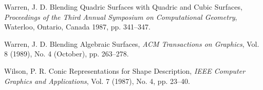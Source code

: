 \begin{thebibliography}{999}
     Warren, J. D.
     Blending Quadric Surfaces with Quadric and Cubic Surfaces,
     {\em Proceedings of the Third Annual Symposium on Computational Geometry},
     Waterloo, Ontario, Canada 1987, pp. 341--347.

     Warren, J. D.
     Blending Algebraic Surfaces,
     {\em ACM Transactions on Graphics},
     Vol. 8 (1989), No. 4 (October), pp. 263--278.

     Wilson, P. R.
     Conic Representations for Shape Description,
     {\em IEEE Computer Graphics and Applications},
     Vol. 7 (1987), No. 4, pp. 23--40.

\end{thebibliography}





